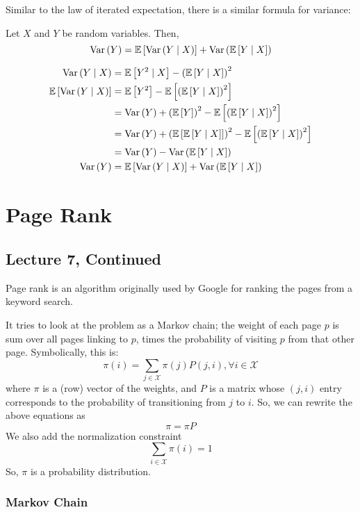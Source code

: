 Similar to the law of iterated expectation, there is a similar formula for variance:
\begin{theorem} 
    Let $X$ and $Y$ be random variables. Then,
    \[ \text{Var}\left( Y \right) = \mathbb{E}\left[ \text{Var}\left( Y \mid X \right) \right] + \text{Var}\left( \mathbb{E}\left[ Y \mid X \right] \right) \]

    \begin{proof*}
        \begin{align*}
            \text{Var}\left( Y \mid X \right) &= \mathbb{E}\left[ Y^2 \mid X \right] - \qty(\mathbb{E}\left[ Y \mid X \right])^2 \\
            \mathbb{E}\left[ \text{Var}\left( Y \mid X \right) \right] &= \mathbb{E}\left[ Y^2 \right] - \mathbb{E}\left[ \qty(\mathbb{E}\left[ Y \mid X \right])^2 \right] \\
            &= \text{Var}\left( Y \right) + \qty(\mathbb{E}\left[ Y \right])^2 -\mathbb{E}\left[ \qty(\mathbb{E}\left[ Y \mid X \right])^2 \right] \\
            &= \text{Var}\left( Y \right) + \qty(\mathbb{E}\left[ \mathbb{E}\left[ Y \mid X \right] \right])^2 - \mathbb{E}\left[ \qty(\mathbb{E}\left[ Y \mid X \right])^2 \right] \\
            &= \text{Var}\left( Y \right) - \text{Var}\left( \mathbb{E}\left[ Y \mid X \right] \right) \\
            \text{Var}\left( Y \right) &= \mathbb{E}\left[ \text{Var}\left( Y \mid X \right) \right] + \text{Var}\left( \mathbb{E}\left[ Y \mid X \right] \right)
        \end{align*}
    \end{proof*}
\end{theorem}

\section{Page Rank}

\subsection{Lecture 7, Continued}

Page rank is an algorithm originally used by Google for ranking the pages from a keyword search.

It tries to look at the problem as a Markov chain;
the weight of each page $p$ is sum over all pages linking to $p$, times
the probability of visiting $p$ from that other page. Symbolically, this is:
\[ \pi(i) = \sum_{j \in \mathcal{X}} \pi(j) P(j, i), \forall i \in \mathcal{X} \]
where $\pi$ is a (row) vector of the weights, and $P$ is a matrix whose $(j, i)$ entry
corresponds to the probability of transitioning from $j$ to $i$. So, we can rewrite the above equations
as
\[ \pi = \pi P \]
We also add the normalization constraint
\[ \sum_{i \in \mathcal{X}} \pi(i) = 1 \]
So, $\pi$ is a probability distribution.

\subsubsection{Markov Chain}

